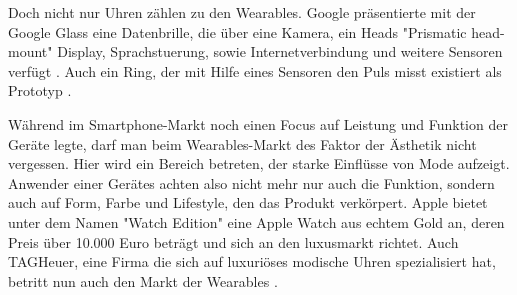 Doch nicht nur Uhren zählen zu den Wearables. Google präsentierte mit der Google Glass eine Datenbrille, die über eine Kamera, ein Heads "Prismatic head-mount" Display, Sprachstuerung, sowie Internetverbindung und weitere Sensoren verfügt \cite{Muensterer2014281}. Auch ein Ring, der mit Hilfe eines Sensoren den Puls misst existiert als Prototyp \cite{4711366}.

Während im Smartphone-Markt noch einen Focus auf Leistung und Funktion der Geräte legte, darf man beim Wearables-Markt des Faktor der Ästhetik nicht vergessen. Hier wird ein Bereich betreten, der starke Einflüsse von Mode aufzeigt. Anwender einer Gerätes achten also nicht mehr nur auch die Funktion, sondern auch auf Form, Farbe und Lifestyle, den das Produkt verkörpert. Apple bietet unter dem Namen "Watch Edition" eine Apple Watch aus echtem Gold an, deren Preis über 10.000 Euro beträgt und sich an den luxusmarkt richtet. Auch TAGHeuer, eine Firma die sich auf luxuriöses modische Uhren spezialisiert hat, betritt nun auch den Markt der Wearables \cite{TAGHeuer:20015aa}.